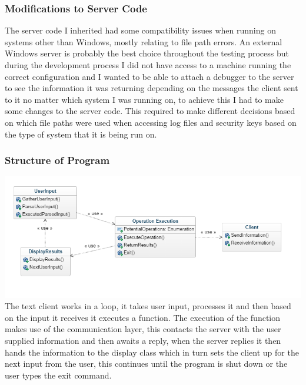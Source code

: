 \documentclass{article}
\begin{document}
\subsubsection{Modifications to Server Code}
The server code I inherited had some compatibility issues when running on systems other than Windows, mostly relating to file path errors. An external Windows server is probably the best choice throughout the testing process but during the development process I did not have access to a machine running the correct configuration and I wanted to be able to attach a debugger to the server to see the information it was returning depending on the messages the client sent to it no matter which system I was running on, to achieve this I had to make some changes to the server code. This required to make different decisions based on which file paths were used when accessing log files and security keys based on the type of system that it is being run on.
\subsubsection{Structure of Program}
\includegraphics[width=\textwidth]{textclient.png}\\
 The text client works in a loop, it takes user input, processes it and then based on the input it receives it executes a function. The execution of the function makes use of the communication layer, this contacts the server with the user supplied information and then awaits a reply, when the server replies it then hands the information to the display class which in turn sets the client up for the next input from the user, this continues until the program is shut down or the user types the exit command.
\end{document}
